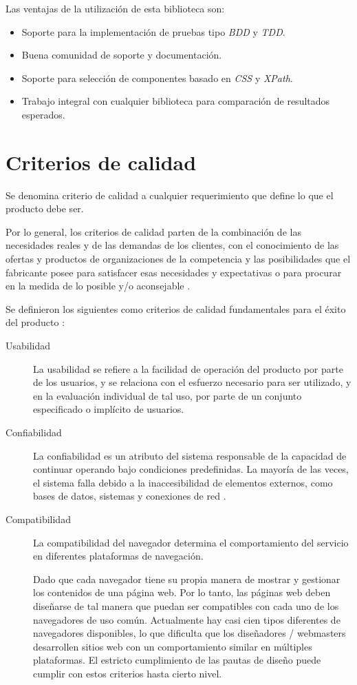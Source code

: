 Las ventajas de la utilización de esta biblioteca son:

\begin{itemize}
    \item Soporte para la implementación de pruebas tipo \emph{BDD} y
        \emph{TDD}.
    \item Buena comunidad de soporte y documentación.
    \item Soporte para selección de componentes basado en \emph{CSS} y
        \emph{XPath}.
    \item Trabajo integral  con cualquier biblioteca para comparación de
        resultados esperados.
\end{itemize}

\section{Criterios de calidad}
Se denomina criterio de calidad a cualquier requerimiento que define lo que el
producto debe ser.

Por lo general, los criterios de calidad parten de la combinación de las
necesidades reales y de las demandas de los clientes, con el conocimiento de las
ofertas y productos de organizaciones de la competencia y las posibilidades que
el fabricante posee para satisfacer esas necesidades y expectativas o para
procurar en la medida de lo posible y/o aconsejable \cite{Haaz}.

Se definieron los siguientes como criterios de calidad fundamentales para el
éxito del producto \cite{Fillottrani}:

\begin{description}
\item [Usabilidad] La usabilidad se refiere a la facilidad de operación del
producto por parte de los usuarios, y se relaciona con el esfuerzo
necesario para ser utilizado, y en la evaluación individual de tal uso, por
parte de un conjunto especificado o implícito de usuarios.

\item [Confiabilidad] La confiabilidad es un atributo del sistema responsable de
la capacidad de continuar operando bajo condiciones predefinidas. La mayoría de
las veces, el sistema falla debido a la inaccesibilidad de elementos externos,
como bases de datos, sistemas y conexiones de red \cite{Ashanin}.

\item [Compatibilidad] La compatibilidad del navegador determina el
comportamiento del servicio en diferentes plataformas de navegación.

Dado que cada navegador tiene su propia manera de mostrar y gestionar los
contenidos de una página web. Por lo tanto, las páginas web deben diseñarse
de tal manera que puedan ser compatibles con cada uno de los navegadores de uso
común. Actualmente hay casi cien tipos diferentes de navegadores disponibles, lo
que dificulta que los diseñadores / webmasters desarrollen sitios web con un
comportamiento similar en múltiples plataformas. El estricto cumplimiento de las
pautas de diseño puede cumplir con estos criterios hasta cierto nivel.
\end{description}

